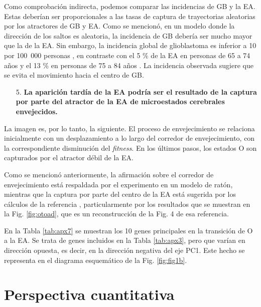 Como comprobación indirecta, podemos comparar las incidencias de GB y la EA. Estas deberían ser proporcionales a las tasas de captura de trayectorias aleatorias por los atractores de GB y EA. Como se mencionó, en un modelo donde la dirección de los saltos es aleatoria, la incidencia de GB debería ser mucho mayor que la de la EA. Sin embargo, la incidencia global de glioblastoma es inferior a 10 por 100 000 personas \cite{Ohgaki2005}, en contraste con el 5 \% de la EA en personas de 65 a 74 años y el 13 \% en personas de 75 a 84 años \cite{alz2023}. La incidencia observada sugiere que se evita el movimiento hacia el centro de GB.

\begin{enumerate}
	\item[5.] \textbf{La aparición tardía de la EA podría ser el resultado de la captura por parte del atractor de la EA de microestados cerebrales envejecidos.}
\end{enumerate}

La imagen es, por lo tanto, la siguiente. El proceso de envejecimiento se relaciona inicialmente con un desplazamiento a lo largo del corredor de envejecimiento, con la correspondiente disminución del \textit{fitness}. En los últimos pasos, los estados O son capturados por el atractor débil de la EA.

Como se mencionó anteriormente, la afirmación sobre el corredor de envejecimiento está respaldada por el experimento en un modelo de ratón, mientras que la captura por parte del centro de la EA está sugerida por los cálculos de la referencia \cite{Gonzalez_2021}, particularmente por los resultados que se muestran en la Fig. \ref{fig:otoad}, que es un reconstrucción de la Fig. 4 de esa referencia.

En la Tabla \ref{tab:apx7} se muestran los 10 genes principales en la transición de O a la EA. Se trata de genes incluidos en la Tabla \ref{tab:apx3}, pero que varían en dirección opuesta, es decir, en la dirección negativa del eje PC1. Este hecho se representa en el diagrama esquemático de la Fig. \ref{fig:fig1b}.


\section{Perspectiva cuantitativa}

